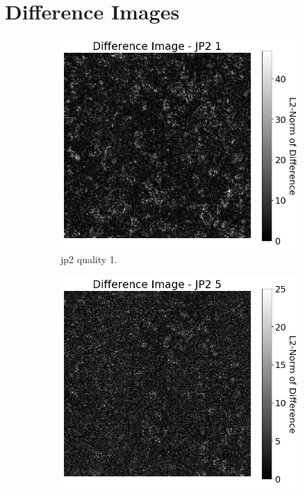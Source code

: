 \section{Difference Images} \label{sec:image_differences}

\begin{figure}[htb]
    \centering
        \begin{subfigure}[b]{0.42\textwidth}
            \centering
            \includegraphics[width=\textwidth]{doc/thesis/0_figures/compare_quality/set1/jp2_1_center_diff_heatmap_rel.png}
            \caption{\gls{jp2} quality 1.}
            \label{fig:img_quality_center_heatmap_rel_1}
        \end{subfigure}
        \begin{subfigure}[b]{0.42\textwidth}
            \centering
            \includegraphics[width=\textwidth]{doc/thesis/0_figures/compare_quality/set1/jp2_5_center_diff_heatmap_rel.png}

\end{subfigure}
\end{figure}
